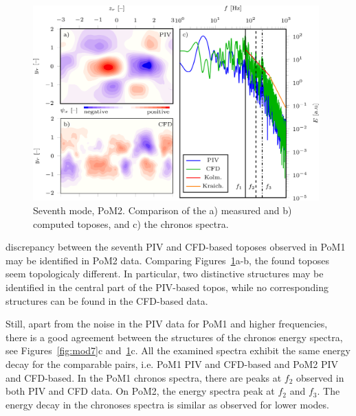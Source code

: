 {\begin{figure}[htbp]
    \centering
    \includegraphics[width=0.98\textwidth]{02_images/00_export/figure18.png}
    \caption{{Seventh mode, PoM2.} Comparison of the a) measured and b) computed toposes, and c) the chronos spectra.}
    \label{fig:pom2mod7}
\end{figure}
{ discrepancy between the seventh PIV and CFD-based toposes  observed in PoM1 may be identified in PoM2 data. Comparing Figures~\ref{fig:pom2mod7}a-b, the found toposes seem topologicaly different. In particular, two distinctive structures may be identified in the central part of the PIV-based topos, while no corresponding structures can be found in the CFD-based data.}

{Still, apart from the noise in the PIV data for PoM1 and higher frequencies, there is a good agreement between the structures of the chronos energy spectra, see Figures~\ref{fig:mod7}c and~\ref{fig:pom2mod7}c. All the examined spectra exhibit the same energy decay for the comparable pairs, i.e. PoM1 PIV and CFD-based and PoM2 PIV and CFD-based. In the PoM1 chronos spectra, there are peaks at $f_{2}$ observed in both PIV and CFD data. On PoM2, the energy spectra peak at $f_{2}$ and $f_{3}$. The energy decay in the chronoses spectra is similar as observed for lower modes.}

}
